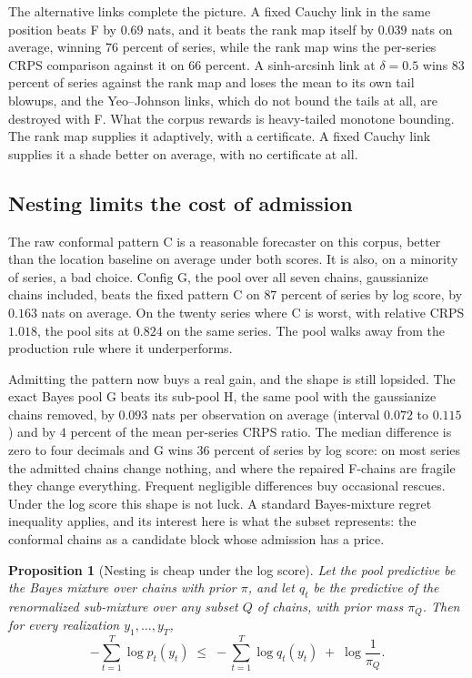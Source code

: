 \documentclass[11pt]{article}
\newtheorem{proposition}{Proposition}
\theoremstyle{remark}
\begin{document}
The alternative links complete the picture. A fixed Cauchy link in the same
position beats F by $0.69$ nats, and it beats the rank map itself by $0.039$ nats on
average, winning $76$ percent of series, while the rank map wins the per-series CRPS
comparison against it on $66$ percent. A sinh-arcsinh link at $\delta = 0.5$ wins
$83$ percent of series against the rank map and loses the mean to its own tail
blowups, and the Yeo--Johnson links, which do not bound the tails at all, are
destroyed with F. What the corpus rewards is heavy-tailed monotone bounding. The
rank map supplies it adaptively, with a certificate. A fixed Cauchy link supplies it
a shade better on average, with no certificate at all.

\subsection{Nesting limits the cost of admission}\label{sec:nesting}

The raw conformal pattern C is a reasonable forecaster on this corpus, better than
the location baseline on average under both scores. It is also, on a minority of
series, a bad choice. Config G, the pool over all seven chains, gaussianize chains
included, beats the fixed pattern C on $87$ percent of series by log score, by
$0.163$ nats on average. On the twenty series where C is worst, with relative CRPS
$1.018$, the pool sits at $0.824$ on the same series. The pool walks away from the
production rule where it underperforms.

Admitting the pattern now buys a real gain, and the shape is still lopsided. The
exact Bayes pool G beats its sub-pool H, the same pool with the gaussianize chains
removed, by $0.093$ nats per observation on average (interval $0.072$ to $0.115$)
and by $4$ percent of the mean per-series CRPS ratio. The median difference is zero
to four decimals and G wins $36$ percent of series by log score: on most series the
admitted chains change nothing, and where the repaired F-chains are fragile they
change everything. Frequent negligible differences buy occasional rescues. Under
the log score this shape is not luck. A standard Bayes-mixture regret inequality
applies, and its interest here is what the subset represents: the conformal chains as a
candidate block whose admission has a price.

\begin{proposition}[Nesting is cheap under the log score]\label{prop:nesting}
Let the pool predictive be the Bayes mixture over chains with prior $\pi$, and let
$q_t$ be the predictive of the renormalized sub-mixture over any subset $Q$ of chains,
with prior mass $\pi_Q$. Then for every realization $y_1, \dots, y_T$,
\[
  -\sum_{t=1}^T \log p_t(y_t) \;\le\; -\sum_{t=1}^T \log q_t(y_t)
  \;+\; \log\frac{1}{\pi_Q}.
\]
\end{proposition}
\end{document}
